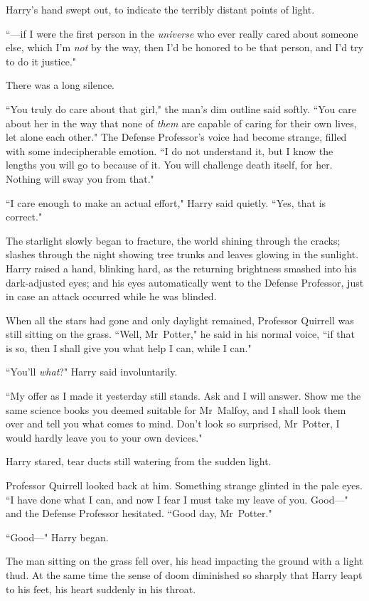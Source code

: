 Harry's hand swept out, to indicate the terribly distant points of light.

``—if I were the first person in the \emph{universe} who ever really cared about someone else, which I'm \emph{not} by the way, then I'd be honored to be that person, and I'd try to do it justice."

There was a long silence.

``You truly do care about that girl," the man's dim outline said softly. ``You care about her in the way that none of \emph{them} are capable of caring for their own lives, let alone each other." The Defense Professor's voice had become strange, filled with some indecipherable emotion. ``I do not understand it, but I know the lengths you will go to because of it. You will challenge death itself, for her. Nothing will sway you from that."

``I care enough to make an actual effort," Harry said quietly. ``Yes, that is correct."

The starlight slowly began to fracture, the world shining through the cracks; slashes through the night showing tree trunks and leaves glowing in the sunlight. Harry raised a hand, blinking hard, as the returning brightness smashed into his dark-adjusted eyes; and his eyes automatically went to the Defense Professor, just in case an attack occurred while he was blinded.

When all the stars had gone and only daylight remained, Professor Quirrell was still sitting on the grass. ``Well, Mr~Potter," he said in his normal voice, ``if that is so, then I shall give you what help I can, while I can."

``You'll \emph{what}?" Harry said involuntarily.

``My offer as I made it yesterday still stands. Ask and I will answer. Show me the same science books you deemed suitable for Mr~Malfoy, and I shall look them over and tell you what comes to mind. Don't look so surprised, Mr~Potter, I would hardly leave you to your own devices."

Harry stared, tear ducts still watering from the sudden light.

Professor Quirrell looked back at him. Something strange glinted in the pale eyes. ``I have done what I can, and now I fear I must take my leave of you. Good—" and the Defense Professor hesitated. ``Good day, Mr~Potter."

``Good—" Harry began.

The man sitting on the grass fell over, his head impacting the ground with a light thud. At the same time the sense of doom diminished so sharply that Harry leapt to his feet, his heart suddenly in his throat.

